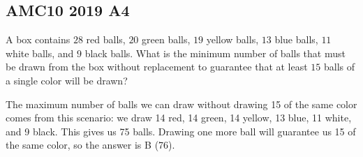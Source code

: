 \documentclass[12pt]{exam}
\begin{document}
\thispagestyle{empty}

\begin{center}\section*{AMC10 2019 A4}

\end{center}
\bigskip
\begin{questions}

\question 
A box contains $28$ red balls, $20$ green balls, $19$ yellow balls, $13$ blue balls, $11$ white balls, and $9$ black balls. 
What is the minimum number of balls that must be drawn from the box 
without replacement to guarantee that at least $15$ balls of a single color will be drawn?
\bigskip

\begin{oneparchoices}
\end{oneparchoices}

\vspace{0.5cm}
The maximum number of balls we can draw without drawing 15 of the same color 
comes from this scenario: 
we draw 14 red, 14 green, 14 yellow, 13 blue, 11 white, and 9 black. 
This gives us 75 balls. Drawing one more ball will guarantee us 15 of the same color, 
so the answer is B (76).

\end{questions}
\end{document}
